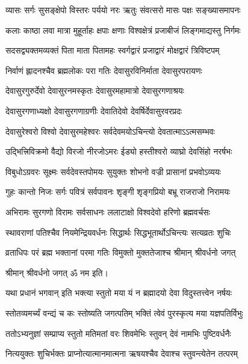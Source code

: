 \twolineshloka
{व्यासः सर्गः सुसङ्क्षेपो विस्तरः पर्ययो नरः}%
{ऋतुः संवत्सरो मासः पक्षः सङ्ख्यासमापनः}%

\twolineshloka
{कलाः काष्ठा लवा मात्रा मुहूर्ताहः क्षपाः क्षणाः}%
{विश्वक्षेत्रं प्रजाबीजं लिङ्गमाद्यस्तु निर्गमः}%

\twolineshloka
{सदसद्व्यक्तमव्यक्तं पिता माता पितामहः}%
{स्वर्गद्वारं प्रजाद्वारं मोक्षद्वारं त्रिविष्टपम्}%

\twolineshloka
{निर्वाणं ह्लादनश्चैव ब्रह्मलोकः परा गतिः}%
{देवासुरविनिर्माता देवासुरपरायणः}%

\twolineshloka
{देवासुरगुरुर्देवो देवासुरनमस्कृतः}%
{देवासुरमहामात्रो देवासुरगणाश्रयः}%

\twolineshloka
{देवासुरगणाध्यक्षो देवासुरगणाग्रणीः}%
{देवातिदेवो देवर्षिर्देवासुरवरप्रदः}%

\twolineshloka
{देवासुरेश्वरो विश्वो देवासुरमहेश्वरः}%
{सर्वदेवमयोऽचिन्त्यो देवतात्माऽऽत्मसम्भवः}%

\twolineshloka
{उद्भित्त्रिविक्रमो वैद्यो विरजो नीरजोऽमरः}%
{ईड्यो हस्तीश्वरो व्याघ्रो देवसिंहो नरर्षभः}%

\twolineshloka
{विबुधोऽग्रवरः सूक्ष्मः सर्वदेवस्तपोमयः}%
{सुयुक्तः शोभनो वज्री प्रासानां प्रभवोऽव्ययः}%

\twolineshloka
{गुहः कान्तो निजः सर्गः पवित्रं सर्वपावनः}%
{शृङ्गी शृङ्गप्रियो बभ्रू राजराजो निरामयः}%

\twolineshloka
{अभिरामः सुरगणो विरामः सर्वसाधनः}%
{ललाटाक्षो विश्वदेवो हरिणो ब्रह्मवर्चसः}%

\twolineshloka
{स्थावराणां पतिश्चैव नियमेन्द्रियवर्धनः}%
{सिद्धार्थः सिद्धभूतार्थोऽचिन्त्यः सत्यव्रतः शुचिः}%

\twolineshloka
{व्रताधिपः परं ब्रह्म भक्तानां परमा गतिः}%
{विमुक्तो मुक्ततेजाश्च श्रीमान् श्रीवर्धनो जगत्}%

श्रीमान् श्रीवर्धनो जगत् ॐ नम इति।

\resetShloka
{}

\twolineshloka
{यथा प्रधानं भगवान् इति भक्त्या स्तुतो मया}
{यं न ब्रह्मादयो देवा विदुस्तत्त्वेन नर्षयः}%

\twolineshloka
{स्तोतव्यमर्च्यं वन्द्यं च कः स्तोष्यति जगत्पतिम्}
{भक्तिं त्वेवं पुरस्कृत्य मया यज्ञपतिर्विभुः}


\twolineshloka
{ततोऽभ्यनुज्ञां सम्प्राप्य स्तुतो मतिमतां वरः}%
{शिवमेभिः स्तुवन् देवं नामभिः पुष्टिवर्धनैः}


\twolineshloka
{नित्ययुक्तः शुचिर्भक्तः प्राप्नोत्यात्मानमात्मना}%
{ऋषयश्चैव देवाश्च स्तुवन्त्येतेन तत्परम्}


